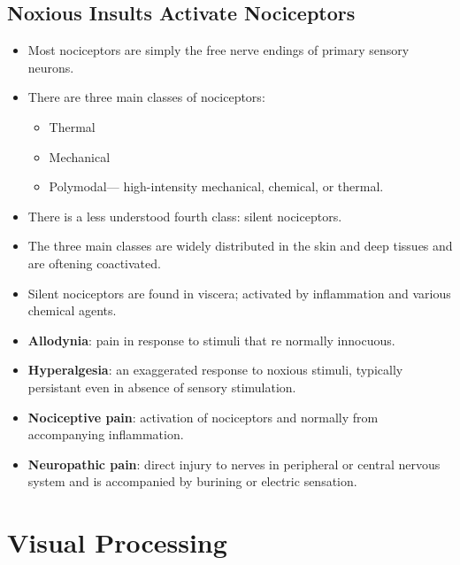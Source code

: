 \documentclass[12pt,a4paper]{article}
\begin{document}
\subsection{Noxious Insults Activate Nociceptors}
\begin{itemize}
    \item Most nociceptors are simply the free nerve endings of primary sensory neurons.
    \item There are three main classes of nociceptors:
        \begin{itemize}
            \item Thermal
            \item Mechanical
            \item Polymodal--- high-intensity mechanical, chemical, or thermal. 
        \end{itemize}
    \item There is a less understood fourth class: silent nociceptors.
    \item The three main classes are widely distributed in the skin and deep tissues and are oftening coactivated.
    \item Silent nociceptors are found in viscera; activated by inflammation and various chemical agents.
    \item \textbf{Allodynia}: pain in response to stimuli that re normally innocuous.
    \item \textbf{Hyperalgesia}: an exaggerated response to noxious stimuli, typically persistant even in absence of sensory stimulation. 
    \item \textbf{Nociceptive pain}: activation of nociceptors and normally from accompanying inflammation.
    \item \textbf{Neuropathic pain}: direct injury to nerves in peripheral or central nervous system and is accompanied by burining or electric sensation.
\end{itemize}

\clearpage
\section{Visual Processing}
\end{document}

